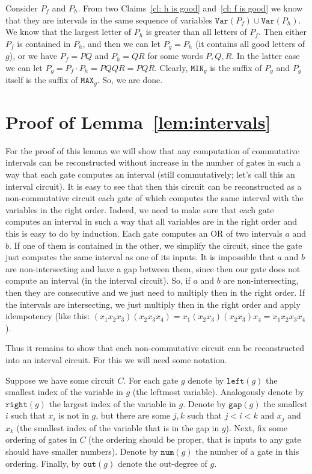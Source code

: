 \documentclass[11pt,letterpaper]{article}
\newcommand{\lef}{\texttt{left}}
\newcommand{\righ}{\texttt{right}}
\newcommand{\gap}{\texttt{gap}}
\newcommand{\num}{\texttt{num}}
\newcommand{\out}{\texttt{out}}
\newcommand{\mmin}{\texttt{MIN}}
\newcommand{\mmax}{\texttt{MAX}}
\newcommand{\var}{\texttt{Var}}
\begin{document}
Consider $P_f$ and $P_h$. From two Claims~\ref{cl: h is good} and~\ref{cl: f is good} we know that they are intervals in the same sequence of variables $\var(P_f)\cup \var(P_h)$. We know that the largest letter of $P_h$ is greater than all letters of $P_f$. Then either $P_f$ is contained in $P_h$, and then we can let $P_g=P_h$ (it contains all good letters of $g$), or we have $P_f =PQ$ and $P_h=QR$ for some words $P, Q, R$. In the latter case we can let $P_g = P_f \cdot P_h = PQQR=PQR$. Clearly, $\mmin_g$ is the suffix of $P_g$ and $P_g$ itself is the suffix of $\mmax_g$. So, we are done.




\section{Proof of Lemma~\ref{lem:intervals}}

For the proof of this lemma we will show that any computation of commutative intervals can be reconstructed without increase in the number of gates in such a way that each gate computes an interval (still commutatively; let's call this an interval circuit). It is easy to see that then this circuit can be reconstructed as a non-commutative circuit each gate of which computes the same interval with the variables in the right order. Indeed, we need to make sure that each gate computes an interval in such a way that all variables are in the right order and this is easy to do by induction. Each gate computes an OR of two intervals $a$ and $b$. If one of them is contained in the other, we simplify the circuit, since the gate just computes the same interval as one of its inputs. It is impossible that $a$ and $b$ are non-intersecting and have a gap between them, since then our gate does not compute an interval (in the interval circuit). So, if $a$ and  $b$ are non-intersecting, then they are consecutive and we just need to multiply then in the right order. If the intervals are intersecting, we just multiply then in the right order and apply idempotency (like this: $(x_1x_2x_3)(x_2x_3x_4)=x_1(x_2x_3)(x_2x_3)x_4=x_1x_2x_3x_4$).

Thus it remains to show that each non-commutative circuit can be reconstructed into an interval circuit. For this we will need some notation.

Suppose we have some circuit $C$. For each gate $g$ denote by $\lef(g)$ the smallest index of the variable in $g$ (the leftmost variable). Analogously denote by $\righ(g)$ the largest index of the variable in $g$. Denote by $\gap(g)$ the smallest $i$ such that $x_i$ is not in $g$, but there are some $j,k$ such that $j<i<k$ and $x_j$ and $x_k$ (the smallest index of the variable that is in the gap in $g$).
Next, fix some ordering of gates in $C$ (the ordering should be proper, that is inputs to any gate should have smaller numbers). Denote by $\num(g)$ the number of a gate in this ordering. Finally, by $\out(g)$ denote the out-degree of $g$.
\end{document}
